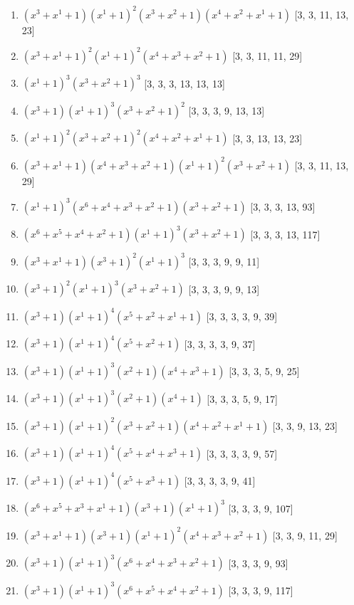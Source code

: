 \documentclass[10pt,twocolumn]{article}
\begin{document}
\begin{enumerate}
\item $(x^{3} + x^{1} + 1)(x^{1} + 1)^{2}(x^{3} + x^{2} + 1)(x^{4} + x^{2} + x^{1} + 1)$  [3, 3, 11, 13, 23]
\item $(x^{3} + x^{1} + 1)^{2}(x^{1} + 1)^{2}(x^{4} + x^{3} + x^{2} + 1)$  [3, 3, 11, 11, 29]
\item $(x^{1} + 1)^{3}(x^{3} + x^{2} + 1)^{3}$  [3, 3, 3, 13, 13, 13]
\item $(x^{3} + 1)(x^{1} + 1)^{3}(x^{3} + x^{2} + 1)^{2}$  [3, 3, 3, 9, 13, 13]
\item $(x^{1} + 1)^{2}(x^{3} + x^{2} + 1)^{2}(x^{4} + x^{2} + x^{1} + 1)$  [3, 3, 13, 13, 23]
\item $(x^{3} + x^{1} + 1)(x^{4} + x^{3} + x^{2} + 1)(x^{1} + 1)^{2}(x^{3} + x^{2} + 1)$  [3, 3, 11, 13, 29]
\item $(x^{1} + 1)^{3}(x^{6} + x^{4} + x^{3} + x^{2} + 1)(x^{3} + x^{2} + 1)$  [3, 3, 3, 13, 93]
\item $(x^{6} + x^{5} + x^{4} + x^{2} + 1)(x^{1} + 1)^{3}(x^{3} + x^{2} + 1)$  [3, 3, 3, 13, 117]
\item $(x^{3} + x^{1} + 1)(x^{3} + 1)^{2}(x^{1} + 1)^{3}$  [3, 3, 3, 9, 9, 11]
\item $(x^{3} + 1)^{2}(x^{1} + 1)^{3}(x^{3} + x^{2} + 1)$  [3, 3, 3, 9, 9, 13]
\item $(x^{3} + 1)(x^{1} + 1)^{4}(x^{5} + x^{2} + x^{1} + 1)$  [3, 3, 3, 3, 9, 39]
\item $(x^{3} + 1)(x^{1} + 1)^{4}(x^{5} + x^{2} + 1)$  [3, 3, 3, 3, 9, 37]
\item $(x^{3} + 1)(x^{1} + 1)^{3}(x^{2} + 1)(x^{4} + x^{3} + 1)$  [3, 3, 3, 5, 9, 25]
\item $(x^{3} + 1)(x^{1} + 1)^{3}(x^{2} + 1)(x^{4} + 1)$  [3, 3, 3, 5, 9, 17]
\item $(x^{3} + 1)(x^{1} + 1)^{2}(x^{3} + x^{2} + 1)(x^{4} + x^{2} + x^{1} + 1)$  [3, 3, 9, 13, 23]
\item $(x^{3} + 1)(x^{1} + 1)^{4}(x^{5} + x^{4} + x^{3} + 1)$  [3, 3, 3, 3, 9, 57]
\item $(x^{3} + 1)(x^{1} + 1)^{4}(x^{5} + x^{3} + 1)$  [3, 3, 3, 3, 9, 41]
\item $(x^{6} + x^{5} + x^{3} + x^{1} + 1)(x^{3} + 1)(x^{1} + 1)^{3}$  [3, 3, 3, 9, 107]
\item $(x^{3} + x^{1} + 1)(x^{3} + 1)(x^{1} + 1)^{2}(x^{4} + x^{3} + x^{2} + 1)$  [3, 3, 9, 11, 29]
\item $(x^{3} + 1)(x^{1} + 1)^{3}(x^{6} + x^{4} + x^{3} + x^{2} + 1)$  [3, 3, 3, 9, 93]
\item $(x^{3} + 1)(x^{1} + 1)^{3}(x^{6} + x^{5} + x^{4} + x^{2} + 1)$  [3, 3, 3, 9, 117]

\end{enumerate}
\end{document}
